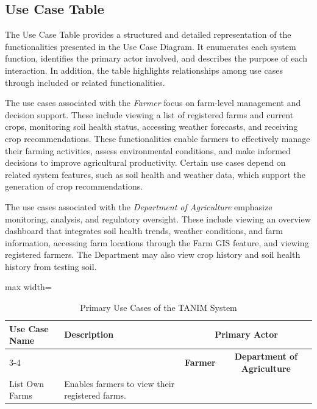 {	\subsection{Use Case Table}
	
	The Use Case Table provides a structured and detailed representation of the functionalities presented in the Use Case Diagram. It enumerates each system function, identifies the primary actor involved, and describes the purpose of each interaction. In addition, the table highlights relationships among use cases through included or related functionalities. 
	
	The use cases associated with the \textit{Farmer} focus on farm-level management and decision support. These include viewing a list of registered farms and current crops, monitoring soil health status, accessing weather forecasts, and receiving crop recommendations. These functionalities enable farmers to effectively manage their farming activities, assess environmental conditions, and make informed decisions to improve agricultural productivity. Certain use cases depend on related system features, such as soil health and weather data, which support the generation of crop recommendations.
	
	The use cases associated with the \textit{Department of Agriculture} emphasize monitoring, analysis, and regulatory oversight. These include viewing an overview dashboard that integrates soil health trends, weather conditions, and farm information, accessing farm locations through the Farm GIS feature, and viewing registered farmers. The Department may also view crop history and soil health history from testing soil.
	
	\begin{table}[H]
		\centering
		\caption{Primary Use Cases of the TANIM System}
		\label{tab:outer_usecases}
		\renewcommand{\arraystretch}{1.3}
		
		\begin{adjustbox}{max width=\textwidth}
			\begin{tabular}{p{5cm}p{7cm}cc}
				\toprule
				\textbf{Use Case Name} & \textbf{Description} & \multicolumn{2}{c}{\textbf{Primary Actor}} \\
				\cmidrule(lr){3-4}
				& & \textbf{Farmer} & \textbf{Department of Agriculture} \\
				\midrule
				
				List Own Farms & Enables farmers to view their registered farms. & \checkmark & \\
				

\end{tabular}
\end{adjustbox}
\end{table}}
